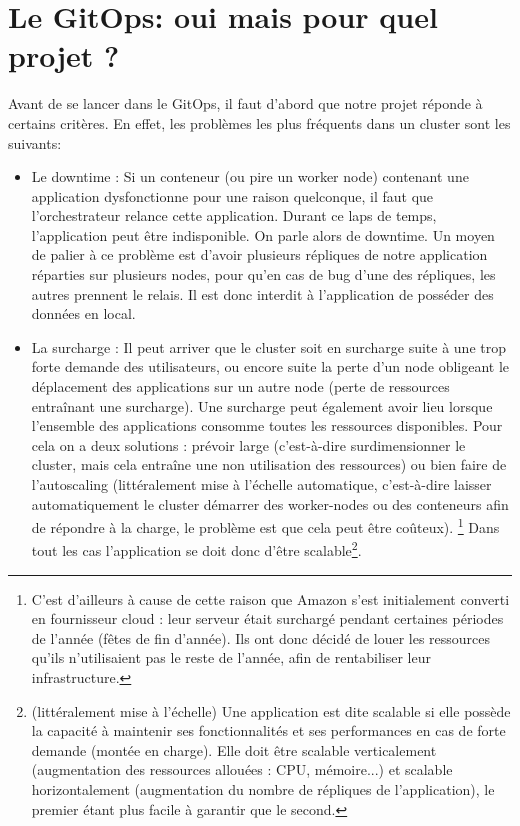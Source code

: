 \documentclass[11pt,fleqn]{book} %
\begin{document}
\section{Le GitOps: oui mais pour quel projet ?}
Avant de se lancer dans le GitOps, il faut d'abord que notre projet réponde à certains critères. En effet, les problèmes les plus fréquents dans un cluster sont les suivants: \\
\begin{itemize}
    \item Le downtime : Si un conteneur (ou pire un worker node) contenant une application dysfonctionne pour une raison quelconque, il faut que l'orchestrateur relance cette application. Durant ce laps de temps, l'application peut être indisponible. On parle alors de downtime. Un moyen de palier à ce problème est d'avoir plusieurs répliques de notre application réparties sur plusieurs nodes, pour qu'en cas de bug d'une des répliques, les autres prennent le relais. Il est donc interdit à l'application de posséder des données en local. \\
    
    \item La surcharge : Il peut arriver que le cluster soit en surcharge suite à une trop forte demande des utilisateurs, ou encore suite la perte d'un node obligeant le déplacement des applications sur un autre node (perte de ressources entraînant une surcharge). Une surcharge peut également avoir lieu lorsque l'ensemble des  applications consomme toutes les ressources disponibles. Pour cela on a deux solutions : prévoir large (c'est-à-dire surdimensionner le cluster, mais cela entraîne une non utilisation des ressources) ou bien faire de l'autoscaling (littéralement mise à l'échelle automatique, c'est-à-dire laisser automatiquement le cluster démarrer des worker-nodes ou des conteneurs afin de répondre à la charge, le problème est que cela peut être coûteux). \footnote{C'est d'ailleurs à cause de cette raison que Amazon s'est initialement converti en fournisseur cloud : leur serveur était surchargé pendant certaines périodes de l'année (fêtes de fin d'année). Ils ont donc décidé de louer les ressources qu'ils n'utilisaient pas le reste de l'année, afin de rentabiliser leur infrastructure.} Dans tout les cas l'application se doit donc d'être scalable\footnote{(littéralement mise à l'échelle) Une application est dite scalable si elle possède la capacité à maintenir ses fonctionnalités et ses performances en cas de forte demande (montée en charge). Elle doit être scalable verticalement (augmentation des ressources allouées :  CPU, mémoire...) et scalable horizontalement (augmentation du nombre de répliques de l'application), le premier étant plus facile à garantir que le second.}.\\


\end{itemize}
\end{document}
